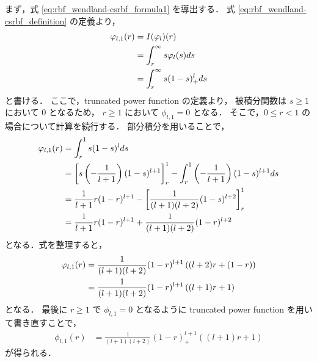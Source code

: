 まず，式 \eqref{eq:rbf_wendland-csrbf_formula1} を導出する．
式 \eqref{eq:rbf_wendland-csrbf_definition} の定義より，
\begin{align}
    \phi_{l,1} (r)
     & = I (\phi_l) (r)
    \notag                              \\
     & = \int_r^\infty s \phi_l(s) ds
    \notag                              \\
     & = \int_r^\infty s (1 - s)_+^l ds
\end{align}
と書ける．
ここで，truncated power function の定義より，
被積分関数は $s \ge 1$ において 0 となるため，
$r \ge 1$ において $\phi_{l,1} = 0$ となる．
そこで，$0 \le r < 1$ の場合について計算を続行する．
部分積分を用いることで，
\begin{align}
    \phi_{l,1} (r)
     & = \int_r^1 s (1 - s)^l ds
    \notag                                                              \\
     & = \left[ s \left( -\frac{1}{l+1} \right) (1-s)^{l+1} \right]_r^1
    - \int_r^1 \left( -\frac{1}{l+1} \right) (1-s)^{l+1} ds
    \notag                                                              \\
     & = \frac{1}{l+1} r (1-r)^{l+1}
    - \left[ \frac{1}{(l+1)(l+2)} (1-s)^{l+2} \right]_r^1
    \notag                                                              \\
     & = \frac{1}{l+1} r (1-r)^{l+1}
    + \frac{1}{(l+1)(l+2)} (1-r)^{l+2}
\end{align}
となる．式を整理すると，
\begin{align}
    \phi_{l,1} (r)
     & = \frac{1}{(l+1)(l+2)} (1-r)^{l+1}
    \left( (l+2)r + (1-r) \right)
    \notag                                                            \\
     & = \frac{1}{(l+1)(l+2)} (1 - r)^{l+1} \left( (l+1)r + 1 \right)
\end{align}
となる．
最後に $r \ge 1$ で $\phi_{l,1} = 0$ となるように truncated power function を用いて書き直すことで，
\begin{align}
    \phi_{l,1} (r)
     & = \frac{1}{(l+1)(l+2)} (1 - r)_+^{l+1} \left( (l+1)r + 1 \right)
\end{align}
が得られる．

